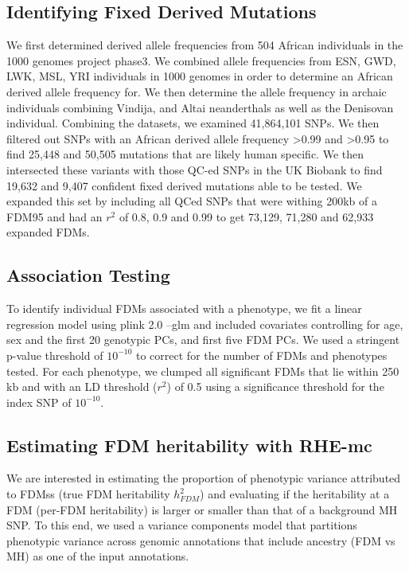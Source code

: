 \subsection{Identifying Fixed Derived Mutations}
 We first determined derived allele frequencies from 504 African individuals in the 1000 genomes project phase3. We combined allele frequencies from ESN, GWD, LWK, MSL, YRI individuals in 1000 genomes in order to determine an African derived allele frequency for. We then determine the allele frequency in archaic individuals combining Vindija, and Altai neanderthals as well as the Denisovan individual. Combining the datasets, we examined 41,864,101 SNPs. We then filtered out SNPs with an African derived allele frequency >0.99 and >0.95 to find 25,448 and 50,505 mutations that are likely human specific. We then intersected these variants with those QC-ed SNPs in the UK Biobank to find 19,632 and 9,407 confident fixed derived mutations able to be tested. We expanded this set by including all QCed SNPs that were withing 200kb of a FDM95 and had an $r^2$ of 0.8, 0.9 and 0.99 to get 73,129, 71,280 and 62,933 expanded FDMs. 
 
\subsection{Association Testing}
To identify individual FDMs associated with a phenotype, we fit a linear regression model using plink 2.0 --glm and included covariates controlling for age, sex and the first 20 genotypic PCs, and first five FDM PCs. We used a stringent p-value threshold of $10^{-10}$ to correct for the number of FDMs and phenotypes tested. For each phenotype, we clumped all significant FDMs that lie within 250 kb and with an LD threshold ($r^2$) of 0.5 using a significance threshold for the index SNP of $10^{-10}$.


\subsection{Estimating FDM heritability with RHE-mc}
We are interested in estimating the proportion of phenotypic variance attributed to FDMss (true FDM heritability $h^2_{FDM}$) and evaluating if the heritability at a FDM (per-FDM heritability) is larger or smaller than that of a background MH SNP. To this end, we used a variance components model that partitions phenotypic variance across genomic annotations that include ancestry (FDM vs MH) as one of the input annotations.

